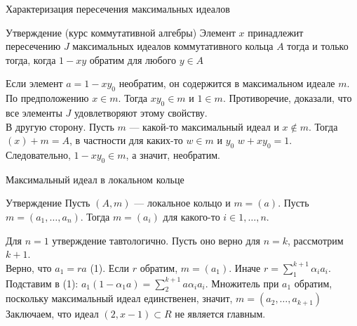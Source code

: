 \documentclass[10pt]{beamer}
\begin{document}
\begin{frame}{Характеризация пересечения максимальных идеалов}

  \begin{block}{Утверждение (курс коммутативной алгебры)}
      Элемент $x$ принадлежит пересечению $J$ максимальных идеалов коммутативного кольца $A$ тогда и только тогда, когда $1-xy$ обратим для любого $y \in A$
  \end{block}
   \pause
   Если элемент $a = 1 - xy_0$ необратим, он содержится в максимальном идеале $m$. По предположению $x \in m$. Тогда $xy_0 \in m$ и $1 \in m$. Противоречие, доказали, что все элементы $J$ удовлетворяют этому свойству.\\
   \pause
   \vspace{0.4cm}
   В другую сторону. Пусть $m$ --- какой-то максимальный идеал и $x \not\in m$. Тогда $(x) + m = A$, в частности для каких-то $w \in m$ и $y_0$ $w + xy_0 = 1$. Следовательно, $1 - xy_0 \in m$, а значит, необратим.

   
\end{frame}

\begin{frame}{Максимальный идеал в локальном кольце}

\begin{block}{Утверждение}
  Пусть $(A, m)$ --- локальное кольцо и $m = (a)$. Пусть $m = (a_1,\ldots,a_n)$. Тогда $m=(a_i)$ для какого-то $i \in {1,\ldots,n}$.
\end{block}
\pause
 Для $n=1$ утверждение тавтологично. Пусть оно верно для $n=k$, рассмотрим $k+1$.\\
 \vspace{0.3cm}
 Верно, что $a_1 = ra$ (1). Если $r$ обратим, $m = (a_1)$. Иначе $r = \sum_1^{k+1}{\alpha_ia_i}$.\\
 Подставим в (1): $a_1(1-\alpha_1a) = \sum_2^{k+1}{a\alpha_ia_i}$. Множитель при $a_1$ обратим, поскольку максимальный идеал единственен, значит, $m = (a_2,\ldots,a_{k+1})$\\
 \pause
 \vspace{0.5cm}
 Заключаем, что идеал $(2,x-1) \subset R$ не является главным.
\end{frame}
\end{document}

